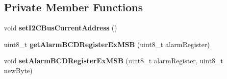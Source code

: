 \subsection*{Private Member Functions}
\begin{DoxyCompactItemize}
\item 
\mbox{\label{class_d_s3231_ae6ef1547a0d2c2653ae3fe4c0f6a62ff}} 
void {\bfseries set\+I2\+C\+Bus\+Current\+Address} ()
\item 
\mbox{\label{class_d_s3231_a70033a61ca1965fa0aed9af31679355f}} 
uint8\+\_\+t {\bfseries get\+Alarm\+B\+C\+D\+Register\+Ex\+M\+SB} (uint8\+\_\+t alarm\+Register)
\item 
\mbox{\label{class_d_s3231_a79280f7161eaa45b50fe649eda9c480a}} 
void {\bfseries set\+Alarm\+B\+C\+D\+Register\+Ex\+M\+SB} (uint8\+\_\+t alarm\+Register, uint8\+\_\+t new\+Byte)
\end{DoxyCompactItemize}
